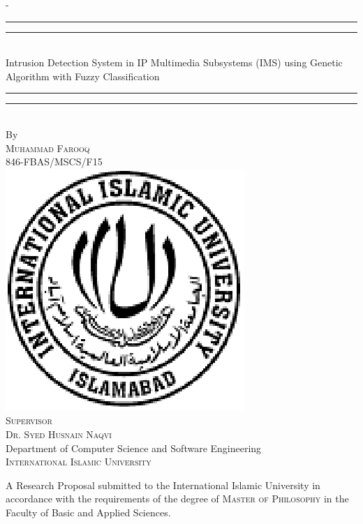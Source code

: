 \begin{titlingpage}
\begin{SingleSpace}
\begin{adjustwidth*}{\unitlength}{-\unitlength}
\begin{center}
\rule[0.5ex]{\linewidth}{2pt}\vspace*{-\baselineskip}\vspace*{2.2pt}
\rule[0.5ex]{\linewidth}{1pt}\\[\baselineskip]
{\HUGE Intrusion Detection System in IP Multimedia Subsystems (IMS) using Genetic Algorithm with Fuzzy Classification }\\[4mm]
\rule[0.5ex]{\linewidth}{1pt}\vspace*{-\baselineskip}\vspace{3.2pt}
\rule[0.5ex]{\linewidth}{2pt}\\
\vspace{6.5mm}
{\large By}\\
\vspace{6.5mm}
{\large\textsc{Muhammad Farooq \\
				846-FBAS/MSCS/F15}}\\
\vspace{11mm}
\includegraphics[scale=0.6]{logos/image1}\\
\vspace{6mm}
{\large\textsc{Supervisor \\
				Dr. Syed Husnain Naqvi}}\\
\vspace{6mm}
{\large Department of Computer Science and Software Engineering\\
\textsc{International Islamic University}}\\
\vspace{11mm}
\begin{minipage}{14cm}
A Research Proposal submitted to the International Islamic University in accordance with the requirements of the degree of \textsc{Master of Philosophy} in the Faculty of Basic and Applied Sciences.

\end{minipage}
\end{center}
\end{adjustwidth*}
\end{SingleSpace}
\end{titlingpage}
